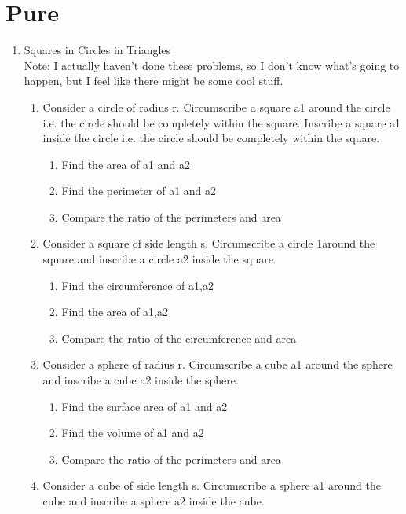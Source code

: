 \documentclass{article}
\begin{document}
\section{Pure}
\label{sec:Pure}
\begin{enumerate}
    \item Squares in Circles in Triangles\\
    Note: I actually haven't done these problems, so I don't know what's going to happen, but I feel like there might be some cool stuff.
    \begin{enumerate}
        \item Consider a circle of radius r. Circumscribe a square a1 around the circle i.e. the circle should be completely within the square. Inscribe a square a1 inside the circle i.e. the circle should be completely within the square.
        \begin{enumerate}
            \item Find the area of a1 and a2
            \item Find the perimeter of a1 and a2
            \item Compare the ratio of the perimeters and area
        \end{enumerate}
        \item Consider a square of side length s. Circumscribe a circle 1around the square and inscribe a circle a2 inside the square.
        \begin{enumerate}
            \item Find the circumference of a1,a2
            \item Find the area of a1,a2
            \item Compare the ratio of the circumference and area
        \end{enumerate}
        \item Consider a sphere of radius r. Circumscribe a cube a1 around the sphere and inscribe a cube a2 inside the sphere.
        \begin{enumerate}
            \item Find the surface area of a1 and a2
            \item Find the volume of a1 and a2
            \item Compare the ratio of the perimeters and area
        \end{enumerate}
        \item Consider a cube of side length s. Circumscribe a sphere a1 around the cube and inscribe a sphere a2 inside the cube.
        \begin{enumerate}

\end{enumerate}
\end{enumerate}
\end{enumerate}
\end{document}
